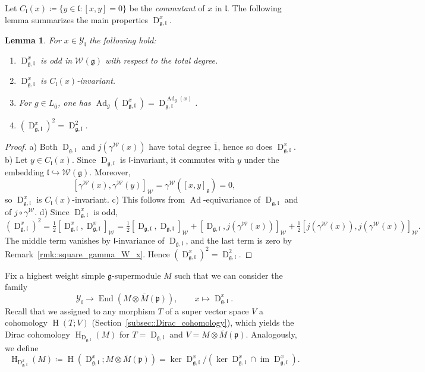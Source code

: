 \documentclass[11pt]{amsart}
\renewcommand{\Im}{\operatorname{im}}
\newcommand{\End}{\operatorname{End}}
\newcommand{\Dirac}{\operatorname{D}}
\def\WW{{\mathcal{W}}}
\def\Weil{{\mathcal{W}(\gg)}}
\def\pp{{\mathfrak p}}
\def\H{{\operatorname{H}}}
\def\Dx{{\operatorname{D}_{\gg,\ll}^{x}}}
\def\ll{{\mathfrak l}}
\def\YY{{\mathcal Y}}
\def\pp{{\mathfrak p}}
\def\pp{{\mathfrak{p}}}
\def\gg{{\mathfrak{g}}}
\newcommand{\Ad}{\operatorname{Ad}}
\theoremstyle{plain}
\newtheorem{lemma}[theorem]{Lemma}
\theoremstyle{remark}
\theoremstyle{definition}
\numberwithin{equation}{section}
\theoremstyle{remark}
\begin{document}
Let $C_{\ll}(x)\coloneqq \{y\in\ll:[x,y]=0\}$ be the \emph{commutant} of $x$ in $\ll$. The following lemma summarizes the main properties $\Dirac^{x}_{\gg,\ll}$.

\begin{lemma}\label{lemm::properties_D_x}
For $x\in\YY_{\ll}$ the following hold:
\begin{enumerate}
\item[a)] $\Dx$ is odd in $\Weil$ with respect to the total degree.
\item[b)] $\Dx$ is $C_{\ll}(x)$-invariant.
\item[c)] For $g\in L_{\bar 0}$, one has $\Ad_{g}(\Dx)=\Dirac^{\Ad_{g}(x)}_{\gg,\ll}$.
\item[d)] $(\Dx)^{2}=\Dirac_{\gg,\ll}^{2}$.
\end{enumerate}
\end{lemma}

\begin{proof}
a) Both $\Dirac_{\gg,\ll}$ and $j(\gamma^{\WW}(x))$ have total degree $\bar 1$, hence so does $\Dx$.
b) Let $y\in C_{\ll}(x)$. Since $\Dirac_{\gg,\ll}$ is $\ll$-invariant, it commutes with $y$ under the embedding $\ll\hookrightarrow\Weil$.
Moreover,
\[
[\gamma^{\WW}(x),\gamma^{\WW}(y)]_{\WW}=\gamma^{\WW}([x,y]_{\gg})=0,
\]
so $\Dx$ is $C_{\ll}(x)$-invariant.
c) This follows from $\Ad$-equivariance of $\Dirac_{\gg,\ll}$ and of $j\circ\gamma^{\WW}$.
d) Since $\Dx$ is odd,
\[
(\Dx)^2=\tfrac12[\Dx,\Dx]_{\WW}
=\tfrac12[\Dirac_{\gg,\ll},\Dirac_{\gg,\ll}]_{\WW}
+[\Dirac_{\gg,\ll},j(\gamma^{\WW}(x))]_{\WW}
+\tfrac12[j(\gamma^{\WW}(x)),j(\gamma^{\WW}(x))]_{\WW}.
\]
The middle term vanishes by $\ll$-invariance of $\Dirac_{\gg,\ll}$, and the last term is zero by
Remark~\ref{rmk::square_gamma_W_x}. Hence $(\Dx)^2=\Dirac_{\gg,\ll}^2$.
\end{proof}

Fix a highest weight simple $\gg$-supermodule $M$ such that we can consider the family
\begin{equation}
 \YY_{\ll} \to \End(M\otimes \overline{M}(\pp)), \qquad x \mapsto \Dx.
\end{equation}
Recall that we assigned to any morphism $T$ of a super vector space $V$ a cohomology $\H(T;V)$ (Section~\ref{subsec::Dirac_cohomology}), which yields the Dirac cohomology $\H_{\Dirac_{\gg,\ll}}(M)$ for $T=\Dirac_{\gg,\ll}$ and $V=M\otimes \overline{M}(\pp)$. Analogously, we define 
\begin{equation}
 \H_{\Dx}(M)\coloneqq \H(\Dx; M\otimes \overline{M}(\pp))=\ker \Dx / (\ker \Dx \cap \Im \Dx).
\end{equation}
\end{document}
